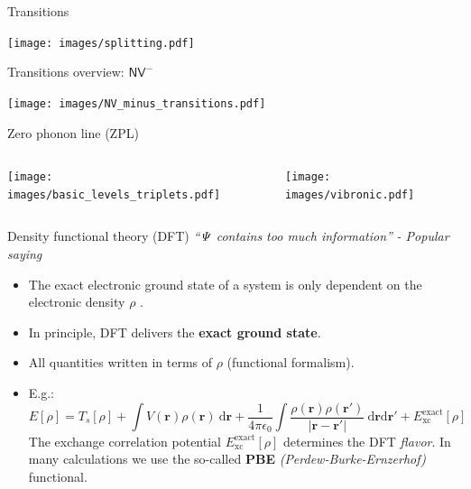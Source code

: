 \documentclass[notes=show]{beamer}
\begin{document}
\begin{frame}{Transitions}
  \begin{center}
    \texttt{[image: images/splitting.pdf]}
  \end{center}
\end{frame}

\begin{frame}{Transitions overview: $ \mathsf{NV}^{-} $ }
  \begin{center}
    \texttt{[image: images/NV\_minus\_transitions.pdf]}
  \end{center}
\end{frame}


\begin{frame}{Zero phonon line (ZPL)}
  \begin{columns}
    \begin{column}{0.5\textwidth}
      \texttt{[image: images/basic\_levels\_triplets.pdf]}
    \end{column}
    \begin{column}{0.5\textwidth}
      \texttt{[image: images/vibronic.pdf]}
    \end{column}
  \end{columns}
\end{frame}

\begin{frame}{Density functional theory (DFT)}
  \textit{``$ \it \Psi  $  contains too much information''}
  \hfill \textit{- Popular saying}
  \begin{itemize}
    \item The exact electronic ground state of a system is only dependent on
      the electronic density $ \rho $ .
    \item In principle, DFT delivers the \textbf{exact ground state}.
    \item All quantities written in terms of $ \rho $ (functional formalism).
    \item E.g.:
      \[
        E[ \rho ] =
        T_{s} [ \rho  ]
        +
        \int  V ( \mathbf{r} ) \rho ( \mathbf{r} ) \ \mathrm{d} \mathbf{r}
        +
        \frac{1}{4\pi \epsilon _{0}}
        \int
        \frac{\rho ( \mathbf{r} ) \rho ( \mathbf{r}' )}{| \mathbf{r} - \mathbf{r}'|}
        \ \mathrm{d} \mathbf{r}\mathrm{d} \mathbf{r}'
        +
        E^{ \mathrm{exact}}_{ \mathrm{xc}} [ \rho ]
      \]
      The exchange correlation potential
      $ E^{ \mathrm{exact}}_{ \mathrm{xc}} [ \rho ] $
      determines the DFT \textit{flavor}.
      In many calculations we use the so-called \textbf{PBE} \textit{(Perdew-Burke-Ernzerhof)} functional.
  \end{itemize}
\end{frame}
\end{document}
